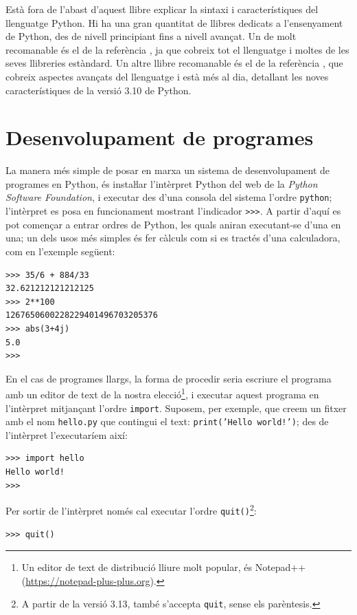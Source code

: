 Està fora de l'abast d'aquest llibre explicar la sintaxi i característiques del llenguatge Python. Hi ha una gran quantitat de llibres dedicats a l'ensenyament de Python, des de nivell principiant fins a nivell avançat. Un de molt recomanable és el de la referència \cite{SUM}, ja que cobreix tot el llenguatge i moltes de les seves llibreries estàndard. Un altre llibre recomanable és el de la referència \cite{RAM}, que cobreix aspectes avançats del llenguatge i està més al dia, detallant les noves característiques de la versió 3.10 de Python.


\section{Desenvolupament de programes}\label{sec:py-desenvel-prog}

La manera més simple de posar en marxa un sistema de desenvolupament de programes en Python, és instaŀlar l'intèrpret Python del web de la \textit{Python Software Foundation}, i executar des d'una consola del sistema l'ordre \texttt{python};
l'intèrpret es posa en funcionament mostrant l'indicador \texttt{>{}>{}>}. A partir d'aquí es pot començar a entrar ordres de Python, les quals aniran executant-se d'una en una; un dels usos més simples és  fer càlculs com si es tractés d'una calculadora, com en l'exemple següent:
\begin{lstlisting}
>>> 35/6 + 884/33
32.621212121212125
>>> 2**100
1267650600228229401496703205376
>>> abs(3+4j)
5.0
>>>
\end{lstlisting}

En el cas de programes llargs, la forma de procedir seria escriure el programa amb un editor de text de la nostra elecció\footnote{Un editor de text de distribució lliure molt popular, és Notepad++ (\href{https://notepad-plus-plus.org/}{https:/\!\!/notepad-plus-plus.org}).}, i executar aquest programa en l'intèrpret mitjançant l'ordre \texttt{import}. Suposem, per exemple, que creem un fitxer amb el nom \texttt{hello.py} que contingui el text: \texttt{print('Hello world!')}; des de l'intèrpret l'executaríem així:
\begin{lstlisting}
>>> import hello
Hello world!
>>>
\end{lstlisting}

Per sortir de l'intèrpret només cal executar l'ordre \texttt{quit()}\footnote{A partir de la versió 3.13, també s'accepta \texttt{quit}, sense els parèntesis.}:
\begin{lstlisting}
>>> quit()
\end{lstlisting}



